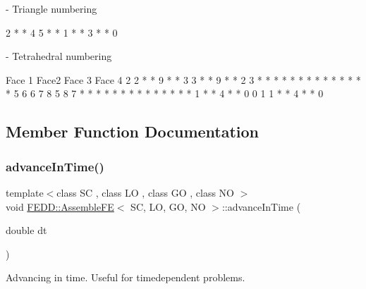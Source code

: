 \begin{DoxyVerb}- Triangle numbering

                2
                *
                *
          4     5
                *
                *
    1 * * 3 * * 0
\end{DoxyVerb}
 



\begin{DoxyVerb}- Tetrahedral numbering

            Face 1          Face2               Face 3            Face 4
                2      2 * * 9 * * 3        3 * * 9 * * 2            3
                *      *          *          *          *           * *
                *      *        *             *        *          *   *
          5     6      6      7                8      5         8     7
                *      *    *                   *    *        *       *
                *      *  *                      *  *       *         *
    1 * * 4 * * 0       0                         1       1 * * 4 * * 0
\end{DoxyVerb}
 



\subsection{Member Function Documentation}
\mbox{\label{classFEDD_1_1AssembleFE_aa291b30d2a3f78705b2a7722a1a04d96}} 
\subsubsection{\texorpdfstring{advance\+In\+Time()}{advanceInTime()}}
{\footnotesize\ttfamily template$<$class SC , class LO , class GO , class NO $>$ \\
void \hyperlink{classFEDD_1_1AssembleFE}{F\+E\+D\+D\+::\+Assemble\+FE}$<$ SC, LO, GO, NO $>$\+::advance\+In\+Time (\begin{DoxyParamCaption}\item[{double}]{dt }\end{DoxyParamCaption})}



Advancing in time. Useful for timedependent problems. 


